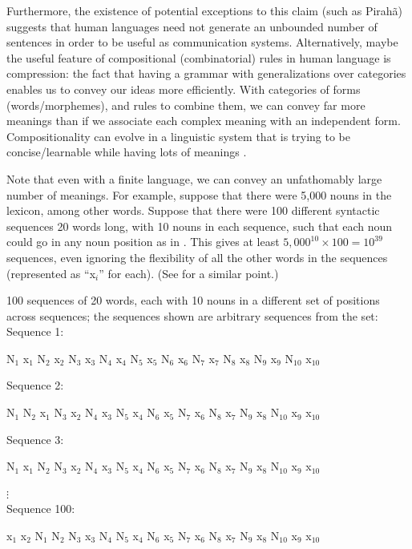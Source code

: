 \documentclass{article}
\begin{document}
Furthermore, the existence of potential exceptions to this claim (such as Pirahã) suggests that human languages need not generate an unbounded number of sentences in order to be useful as communication systems. Alternatively, maybe the useful feature of compositional (combinatorial) rules in human language is compression: the fact that having a grammar with generalizations over categories enables us to convey our ideas more efficiently. With categories of forms (words\slash morphemes), and rules to combine them, we can convey far more meanings than if we associate each complex meaning with an independent form. Compositionality can evolve in a linguistic system that is trying to be concise/learn\-able while having lots of meanings \citep{kirby2000syntax}.


Note that even with a finite language, we can convey an unfathomably large number of meanings. For example, suppose that there were 5,000 nouns in the lexicon, among other words. Suppose that there were 100 different syntactic sequences 20 words long, with 10 nouns in each sequence, such that each noun could go in any noun position as in . This gives at least $5{,}000^{10} \times 100 = 10^{39}$ sequences, even ignoring the flexibility of all the other words in the sequences (represented as ``x$_i$'' for each). (See \citet{muller2016grammatical} for a similar point.)

\ea
\label{ex1}
100 sequences of 20 words, each with 10 nouns in a different set of positions across sequences; the sequences shown are arbitrary sequences from the set:\medskip\\
Sequence 1: \begin{center} N$_1$ x$_1$ N$_2$ x$_2$ N$_3$ x$_3$ N$_4$ x$_4$ N$_5$ x$_5$ N$_6$ x$_6$ N$_7$ x$_7$ N$_8$ x$_8$ N$_9$ x$_9$ N$_{10}$ x$_{10}$ \end{center}
Sequence 2: \begin{center} N$_1$ N$_2$ x$_1$ N$_3$ x$_2$ N$_4$ x$_3$ N$_5$ x$_4$ N$_6$ x$_5$ N$_7$ x$_6$ N$_8$ x$_7$ N$_9$ x$_8$ N$_{10}$ x$_9$ x$_{10}$ \end{center}
Sequence 3: \begin{center} N$_1$ x$_1$ N$_2$ N$_3$ x$_2$ N$_4$ x$_3$ N$_5$ x$_4$ N$_6$ x$_5$ N$_7$ x$_6$ N$_8$ x$_7$ N$_9$ x$_8$ N$_{10}$ x$_9$ x$_{10}$ \end{center}
\quad $\vdots$\\
Sequence 100: \begin{center} x$_1$ x$_2$ N$_1$ N$_2$ N$_3$ x$_3$ N$_4$ N$_5$ x$_4$ N$_6$ x$_5$ N$_7$ x$_6$ N$_8$ x$_7$ N$_9$ x$_8$ N$_{10}$ x$_9$ x$_{10}$ \end{center}
\z
\end{document}
